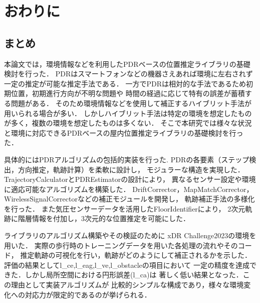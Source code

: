 \chapter{おわりに}
\thispagestyle{myheadings}


\section{まとめ}
本論文では，環境情報などを利用したPDRベースの位置推定ライブラリの基礎検討を行った．
PDRはスマートフォンなどの機器さえあれば環境に左右されず一定の推定が可能な推定手法である．
一方でPDRは相対的な手法であるため初期位置，初期進行方向が不明な問題や
時間の経過に応じて特有の誤差が蓄積する問題がある．
そのため環境情報などを使用して補正するハイブリット手法が用いられる場合が多い．
しかしハイブリット手法は特定の環境を想定したものが多く，複数の環境を想定したものは多くない．
そこで本研究では様々な状況と環境に対応できるPDRベースの屋内位置推定ライブラリの基礎検討を行った．

具体的にはPDRアルゴリズムの包括的実装を行った.
PDRの各要素（ステップ検出，方向推定，軌跡計算）を柔軟に設計し，
モジュラーな構造を実現した．TrajectoryCalculatorとPDREstimatorの設計により，
異なるセンサー設定や環境に適応可能なアルゴリズムを構築した．
DriftCorrector，MapMatchCorrector，WirelessSignalCorrectorなどの補正モジュールを開発し，
軌跡補正手法の多様化を行った．
また気圧センサーデータを活用したFloorIdentifierにより，
2次元軌跡に階層情報を付加し，3次元的な位置推定を可能にした．

ライブラリのアルゴリズム構築やその検証のために
xDR Challenge2023の環境を用いた．
実際の歩行時のトレーニングデータを用いた各処理の流れやそのコード，
推定軌跡の可視化を行い，軌跡がどのようにして補正されるかを示した．
評価の結果としてl\_ce,l\_eag,l\_ve,l\_obstacleの項目において
一定の精度を達成できた．しかし局所空間における円形誤差(l\_ca)は
著しく低い結果となった．この理由として実装アルゴリズムが
比較的シンプルな構成であり，様々な環境変化への対応力が限定的であるのが挙げられる．



